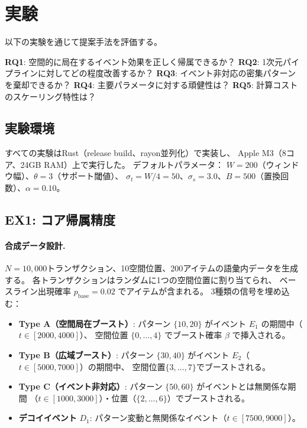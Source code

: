 \section{実験}\label{sec:experiments}

以下の実験を通じて提案手法を評価する。

\textbf{RQ1}: 空間的に局在するイベント効果を正しく帰属できるか？
\textbf{RQ2}: 1次元パイプラインに対してどの程度改善するか？
\textbf{RQ3}: イベント非対応の密集パターンを棄却できるか？
\textbf{RQ4}: 主要パラメータに対する頑健性は？
\textbf{RQ5}: 計算コストのスケーリング特性は？

\subsection{実験環境}

すべての実験はRust（release build、rayon並列化）で実装し、
Apple M3（8コア、24GB RAM）上で実行した。
デフォルトパラメータ：
$W = 200$（ウィンドウ幅）、$\theta = 3$（サポート閾値）、
$\sigma_t = W/4 = 50$、$\sigma_s = 3.0$、$B = 500$（置換回数）、$\alpha = 0.10$。

\subsection{EX1: コア帰属精度}\label{sec:ex1}

\paragraph{合成データ設計.}
$N = 10{,}000$トランザクション、10空間位置、200アイテムの語彙内データを生成する。
各トランザクションはランダムに1つの空間位置に割り当てられ、
ベースライン出現確率 $p_{\mathrm{base}} = 0.02$ でアイテムが含まれる。
3種類の信号を埋め込む：
\begin{itemize}
\item \textbf{Type A（空間局在ブースト）}: パターン $\{10, 20\}$ がイベント $E_1$ の期間中（$t \in [2000, 4000]$）、
空間位置 $\{0, \ldots, 4\}$ でブースト確率 $\beta$ で挿入される。
\item \textbf{Type B（広域ブースト）}: パターン $\{30, 40\}$ がイベント $E_2$（$t \in [5000, 7000]$）の期間中、
空間位置$\{3, \ldots, 7\}$でブーストされる。
\item \textbf{Type C（イベント非対応）}: パターン $\{50, 60\}$ がイベントとは無関係な期間
（$t \in [1000, 3000]$）・位置（$\{2, \ldots, 6\}$）でブーストされる。
\item \textbf{デコイイベント} $D_1$: パターン変動と無関係なイベント（$t \in [7500, 9000]$）。
\end{itemize}

